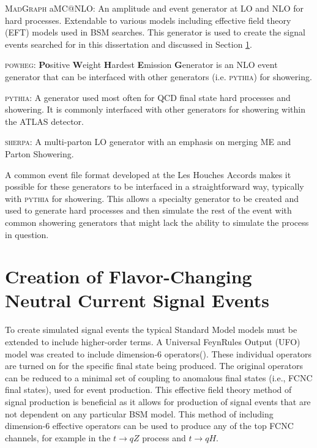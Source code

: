\textsc{MadGraph} aMC@NLO\cite{MadGraph}: An amplitude and event generator at LO and NLO for hard processes.  Extendable to various models including effective field theory (EFT) models used in BSM searches.  This generator is used to create the signal events searched for in this dissertation and discussed in Section \ref{Sec:MG5Sig}. 

\textsc{powheg}\cite{Powheg1,Powheg2}: \textbf{Po}sitive \textbf{W}eight \textbf{H}ardest \textbf{E}mission \textbf{G}enerator is an NLO event generator that can be interfaced with other generators (i.e. \textsc{pythia}) for showering.

\textsc{pythia}\cite{Pythia8}: A generator used most often for QCD final state hard processes and showering.  It is commonly interfaced with other generators for showering within the ATLAS detector.

\textsc{sherpa}\cite{Sherpa11,Sherpa22}: A multi-parton LO generator with an emphasis on merging ME and Parton Showering.

A common event file format developed at the Les Houches Accords\cite{Alwall:2006yp} makes it possible for these generators to be interfaced in a straightforward way, typically with \textsc{pythia} for showering.  This allows a specialty generator to be created and used to generate hard processes and then simulate the rest of the event with common showering generators that might lack the ability to simulate the process in question.



\section{Creation of Flavor-Changing Neutral Current Signal Events}
\label{Sec:MG5Sig}
To create simulated signal events the typical Standard Model models must be extended to include higher-order terms.  A Universal FeynRules Output (UFO\cite{UFO}) model was created to include dimension-6 operators(\cite{Dim6TermsOld, Dim6Terms}).  These individual operators are turned on for the specific final state being produced.  The original operators can be reduced to a minimal set of coupling to anomalous final states (i.e., FCNC final states)\cite{TopCouplingsAguilarSaavedra}, used for event production.  This effective field theory method of signal production is beneficial as it allows for production of signal events that are not dependent on any particular BSM model.  This method of including dimension-6 effective operators can be used to produce any of the top FCNC channels, for example in the $t\rightarrow qZ$ process\cite{FCNCtqZ} and $t\rightarrow qH$\cite{UFOModel}.

